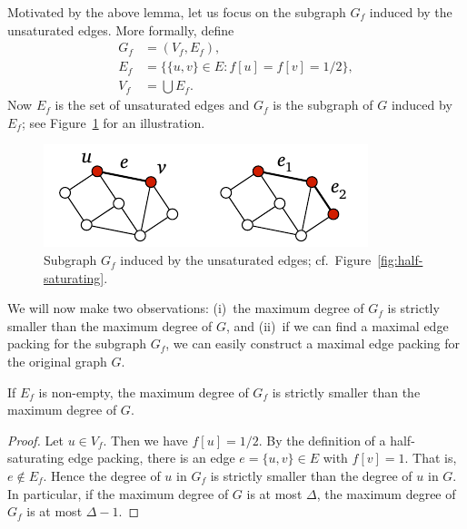 Motivated by the above lemma, let us focus on the subgraph $G_f$ induced by the unsaturated edges. More formally, define
\begin{align*}
    G_f &= (V_f, E_f), \\
    E_f &= \bigl\{ \{u,v\} \in E : f[u] = f[v] = 1/2 \bigr\}, \\
    V_f &= \bigcup E_f.
\end{align*}
Now $E_f$ is the set of unsaturated edges and $G_f$ is the subgraph of $G$ induced by $E_f$; see Figure~\ref{fig:half-saturating-b} for an illustration.

\begin{figure}
    \centering
    \includegraphics[page=\PHalfSaturatingB]{figs.pdf}
    \caption{Subgraph $G_f$ induced by the unsaturated edges; cf.~Figure~\ref{fig:half-saturating}.}\label{fig:half-saturating-b}
\end{figure}

We will now make two observations: (i)~the maximum degree of $G_f$ is strictly smaller than the maximum degree of $G$, and (ii)~if we can find a maximal edge packing for the subgraph $G_f$, we can easily construct a maximal edge packing for the original graph $G$.

\begin{lemma}\label{lem:half-sat-degree}
    If $E_f$ is non-empty, the maximum degree of $G_f$ is strictly smaller than the maximum degree of $G$.
\end{lemma}
\begin{proof}
    Let $u \in V_f$. Then we have $f[u] = 1/2$. By the definition of a half-saturating edge packing, there is an edge $e = \{u,v\} \in E$ with $f[v] = 1$. That is, $e \notin E_f$. Hence the degree of $u$ in $G_f$ is strictly smaller than the degree of $u$ in $G$. In particular, if the maximum degree of $G$ is at most $\Delta$, the maximum degree of $G_f$ is at most $\Delta-1$.
\end{proof}

